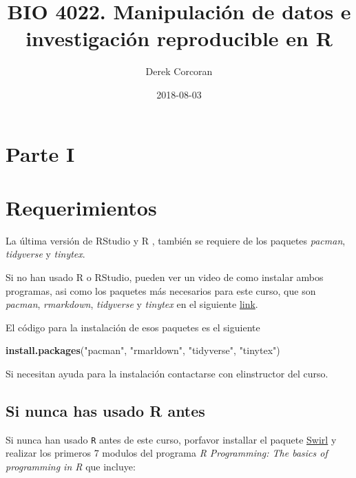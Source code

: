 \documentclass[]{book}
\title{BIO 4022. Manipulación de datos e investigación reproducible en R}
\author{Derek Corcoran}
\date{2018-08-03}
\newenvironment{Shaded}{\begin{snugshade}}{\end{snugshade}}
\newcommand{\KeywordTok}[1]{\textcolor[rgb]{0.13,0.29,0.53}{\textbf{#1}}}
\newcommand{\NormalTok}[1]{#1}
\newcommand{\StringTok}[1]{\textcolor[rgb]{0.31,0.60,0.02}{#1}}
\begin{document}
\maketitle

{
\setcounter{tocdepth}{1}
\tableofcontents
}
\hypertarget{parte-i}{%
\chapter*{Parte I}\label{parte-i}}

\hypertarget{requerimientos}{%
\chapter{Requerimientos}\label{requerimientos}}

La última versión de RStudio y R \citep{R-base}, también se requiere de
los paquetes \emph{pacman}, \emph{tidyverse} y \emph{tinytex}.

Si no han usado R o RStudio, pueden ver un video de como instalar ambos
programas, asi como los paquetes más necesarios para este curso, que son
\emph{pacman}, \emph{rmarkdown}, \emph{tidyverse} y \emph{tinytex} en el
siguiente \href{https://youtu.be/RtkCAKXsVbw}{link}.

El código para la instalación de esos paquetes es el siguiente

\begin{Shaded}
\begin{Highlighting}[]
\KeywordTok{install.packages}\NormalTok{(}\StringTok{"pacman"}\NormalTok{, }\StringTok{"rmarldown"}\NormalTok{, }\StringTok{"tidyverse"}\NormalTok{, }\StringTok{"tinytex"}\NormalTok{)}
\end{Highlighting}
\end{Shaded}

Si necesitan ayuda para la instalación contactarse con elinstructor del
curso.

\hypertarget{si-nunca-has-usado-r-antes}{%
\section{Si nunca has usado R antes}\label{si-nunca-has-usado-r-antes}}

Si nunca han usado \texttt{R} antes de este curso, porfavor installar el
paquete \href{http://swirlstats.com/students.html}{Swirl}
\citep{Kross2017} y realizar los primeros 7 modulos del programa \emph{R
Programming: The basics of programming in R} que incluye:
\end{document}
